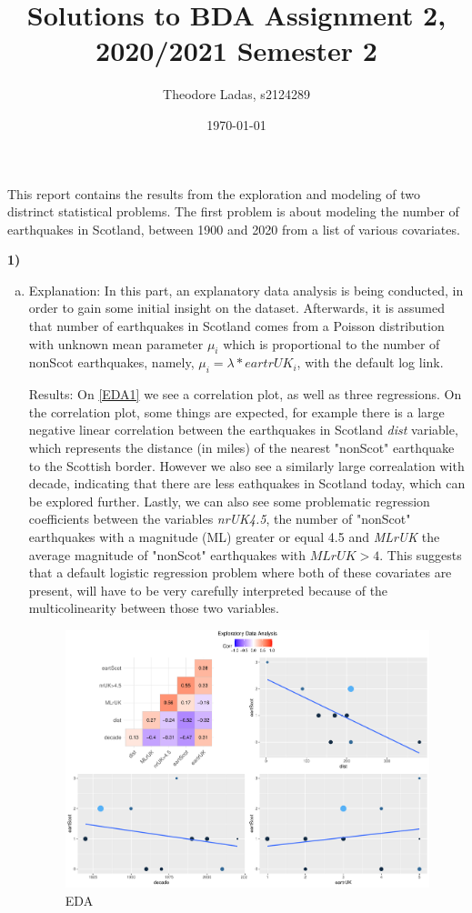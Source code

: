 \documentclass[12pt,a4paper]{article}
\begin{document}
\title{Solutions to BDA Assignment 2,
 2020/2021 Semester 2}
\author{Theodore Ladas, s2124289}
\date{\today}
\maketitle

This report contains the results from the exploration and modeling of two distrinct statistical problems. The first problem is about modeling the number of earthquakes in Scotland, between 1900 and 2020 from a list of various covariates. 

\noindent\textbf{1)}
\begin{enumerate}[(a)]
\item
Explanation: In this part, an explanatory data analysis is being conducted, in order to gain some initial insight on the dataset. Afterwards, it is assumed that number of earthquakes in Scotland comes from a Poisson distribution with unknown mean parameter $\mu_i$   which is proportional to the number of nonScot earthquakes, namely, 
$\mu_i=\lambda * eartrUK_i$, with the default log link. 

Results:
On \autoref{EDA1} we see a correlation plot, as well as three regressions. On the correlation plot, some things are expected, for example there is a large negative linear correlation between the earthquakes in Scotland \textit{dist} variable, which represents the distance (in miles) of the nearest "nonScot" earthquake to the Scottish border. However we also see a similarly large correalation with decade, indicating that there are less eathquakes in Scotland today, which can be explored further. Lastly, we can also see some problematic regression coefficients between the variables \textit{nrUK4.5}, the number of "nonScot" earthquakes with a magnitude (ML) greater or equal 4.5 and \textit{MLrUK} the average magnitude of "nonScot" earthquakes with $MLrUK > 4$. This suggests that a default logistic regression problem where both of these covariates are present, will have to be very carefully interpreted because of the multicolinearity between those two variables. 

\begin{figure}[h]
    \centering
    \includegraphics[width=0.7\linewidth]{figures/Rplot00.pdf}
    \caption{EDA}
    \label{EDA1}
\end{figure}


\end{enumerate}
\end{document}
